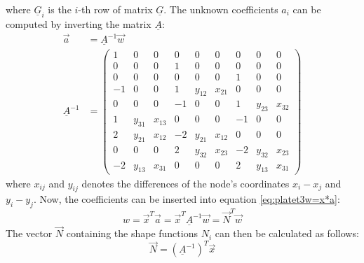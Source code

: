   where $\underline{G}_i$ is the $i$-th row of matrix $\underline{G}$.
  The unknown coefficients $a_i$ can be computed by inverting the matrix $\underline{A}$:
  \begin{align}
  \vec{a} &= \underline{A}^{-1} \vec{w} \nonumber\\
  \underline{A}^{-1} &= \begin{pmatrix}
  1& 0& 0& 0& 0& 0& 0& 0& 0\\
  0& 0& 0& 1& 0& 0& 0& 0& 0\\
  0& 0& 0& 0& 0& 0& 1& 0& 0\\
  -1& 0& 0& 1& y_{12}& x_{21}& 0& 0& 0\\
  0& 0& 0& -1& 0& 0& 1& y_{23}& x_{32}\\
  1& y_{31}& x_{13}& 0& 0& 0& -1& 0& 0\\
  2& y_{21}& x_{12}& -2& y_{21}& x_{12}& 0& 0& 0\\
  0& 0& 0& 2& y_{32}& x_{23}& -2& y_{32}& x_{23}\\
  -2& y_{13}& x_{31}& 0& 0& 0& 2& y_{13}& x_{31}
  \end{pmatrix}
  \end{align}
  where $x_{ij}$ and $y_{ij}$ denotes the differences of the node's coordinates $x_i-x_j$ and $y_i-y_j$.
  Now, the coefficients can be inserted into equation \eqref{eq:platet3w=x*a}:
  \begin{equation}\label{eq:w=NT*vecw}
  w = \vec{x}^T \vec{a} = \vec{x}^T \underline{A}^{-1} \vec{w} = \vec{N}^T \vec{w}
  \end{equation}
  The vector $\vec{N}$ containing the shape functions $N_i$ can then be calculated as follows:
  \begin{equation}
  \vec{N} = \left(\underline{A}^{-1}\right)^T \vec{x}
  \end{equation}
  
